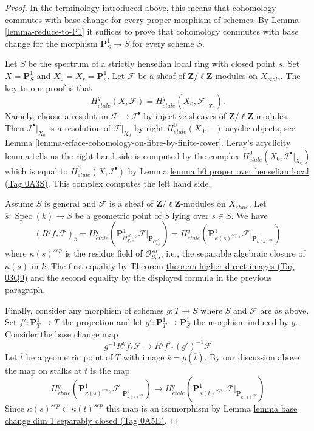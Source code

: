 \documentclass{amsart}
\theoremstyle{plain}
\theoremstyle{definition}
\theoremstyle{remark}
\numberwithin{equation}{subsection}
\def\Spec{\mathop{\mathrm{Spec}}}
\def\etale{{\acute{e}tale}}
\begin{document}
\begin{proof}
In the terminology introduced above, this means that cohomology commutes
with base change for every proper morphism of schemes. By
Lemma \ref{lemma-reduce-to-P1}
it suffices to prove that cohomology commutes with base change
for the morphism $\mathbf{P}^1_S \to S$ for every scheme $S$.

\medskip\noindent
Let $S$ be the spectrum of a strictly henselian local ring with closed
point $s$. Set $X = \mathbf{P}^1_S$ and $X_0 = X_s = \mathbf{P}^1_s$.
Let $\mathcal{F}$ be a sheaf of $\mathbf{Z}/\ell\mathbf{Z}$-modules
on $X_\etale$. The key to our proof is that
$$
H^q_\etale(X, \mathcal{F}) = H^q_\etale(X_0, \mathcal{F}|_{X_0}).
$$
Namely, choose a resolution $\mathcal{F} \to \mathcal{I}^\bullet$
by injective sheaves of $\mathbf{Z}/\ell\mathbf{Z}$-modules.
Then $\mathcal{I}^\bullet|_{X_0}$ is a resolution of $\mathcal{F}|_{X_0}$
by right $H^0_\etale(X_0, -)$-acyclic objects, see
Lemma \ref{lemma-efface-cohomology-on-fibre-by-finite-cover}.
Leray's acyclicity lemma tells us the right hand side is computed by
the complex $H^0_\etale(X_0, \mathcal{I}^\bullet|_{X_0})$
which is equal to $H^0_\etale(X, \mathcal{I}^\bullet)$ by
Lemma \href{https://stacks.math.columbia.edu/tag/0A3S}{lemma h0 proper over henselian local (Tag 0A3S)}. This complex
computes the left hand side.

\medskip\noindent
Assume $S$ is general and $\mathcal{F}$ is a sheaf of
$\mathbf{Z}/\ell\mathbf{Z}$-modules on $X_\etale$.
Let $\overline{s} : \Spec(k) \to S$ be a geometric point
of $S$ lying over $s \in S$. We have
$$
(R^qf_*\mathcal{F})_{\overline{s}} =
H^q_\etale(\mathbf{P}^1_{\mathcal{O}_{S, \overline{s}}^{sh}},
\mathcal{F}|_{\mathbf{P}^1_{\mathcal{O}_{S, \overline{s}}^{sh}}}) =
H^q_\etale(\mathbf{P}^1_{\kappa(s)^{sep}},
\mathcal{F}|_{\mathbf{P}^1_{\kappa(s)^{sep}}})
$$
where $\kappa(s)^{sep}$ is the residue field of
$\mathcal{O}_{S, \overline{s}}^{sh}$, i.e., the separable algebraic
closure of $\kappa(s)$ in $k$.
The first equality by Theorem \href{https://stacks.math.columbia.edu/tag/03Q9}{theorem higher direct images (Tag 03Q9)}
and the second equality by the displayed formula in the
previous paragraph.

\medskip\noindent
Finally, consider any morphism of schemes $g : T \to S$ where
$S$ and $\mathcal{F}$ are as above.
Set $f' : \mathbf{P}^1_T \to T$ the projection and let
$g' : \mathbf{P}^1_T \to \mathbf{P}^1_S$ the morphism induced
by $g$. Consider the base change map
$$
g^{-1}R^qf_*\mathcal{F}
\longrightarrow
R^qf'_*(g')^{-1}\mathcal{F}
$$
Let $\overline{t}$ be a geometric point of $T$ with image
$\overline{s} = g(\overline{t})$. By our discussion
above the map on stalks at $\overline{t}$ is the map
$$
H^q_\etale(\mathbf{P}^1_{\kappa(s)^{sep}},
\mathcal{F}|_{\mathbf{P}^1_{\kappa(s)^{sep}}})
\longrightarrow
H^q_\etale(\mathbf{P}^1_{\kappa(t)^{sep}},
\mathcal{F}|_{\mathbf{P}^1_{\kappa(t)^{sep}}})
$$
Since $\kappa(s)^{sep} \subset \kappa(t)^{sep}$ this map is an
isomorphism by Lemma \href{https://stacks.math.columbia.edu/tag/0A5E}{lemma base change dim 1 separably closed (Tag 0A5E)}.


\end{proof}
\end{document}
